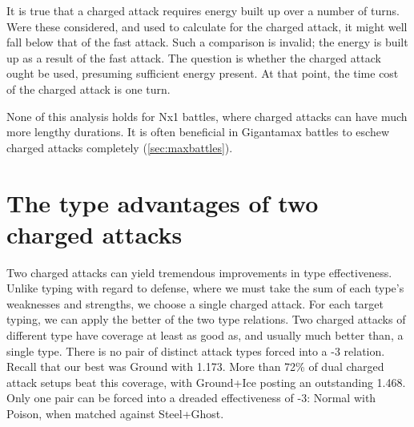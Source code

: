 It is true that a charged attack requires energy built up over a number of turns.
Were these considered, and used to calculate \PPT{} for the charged attack,
  it might well fall below that of the fast attack.
Such a comparison is invalid; the energy is built up as a result of the fast attack.
The question is whether the charged attack ought be used, presuming sufficient energy present.
At that point, the time cost of the charged attack is one turn.

None of this analysis holds for Nx1 battles, where charged attacks can have much more lengthy durations.
It is often beneficial in Gigantamax battles to eschew charged attacks completely (\autoref{sec:maxbattles}).

\section{The type advantages of two charged attacks\label{sec:dualcharged}}
Two charged attacks can yield tremendous improvements in type effectiveness.
Unlike typing with regard to defense, where we must take the sum of each type's
 weaknesses and strengths, we choose a single charged attack.
For each target typing, we can apply the better of the two type relations.
Two charged attacks of different type have coverage at least as good as,
  and usually much better than, a single type.
There is no pair of distinct attack types forced into a -3 relation.
Recall that our best \ARA{} was Ground with 1.173.
More than 72\% of dual charged attack setups beat this coverage,
 with Ground+Ice posting an outstanding 1.468.
Only one pair can be forced into a dreaded effectiveness of -3:
 Normal with Poison, when matched against Steel+Ghost.


